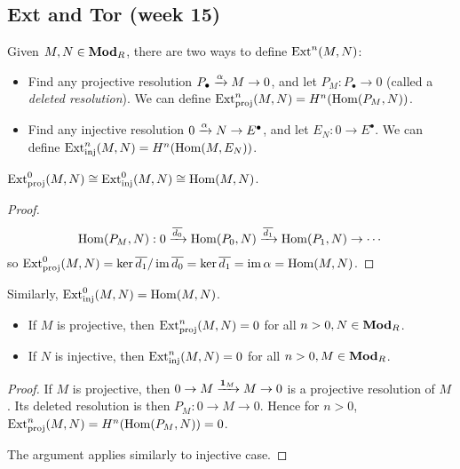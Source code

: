 \subsection{Ext and Tor (week 15)}

Given $M, N \in \mathbf{Mod}_R$, there are two ways to define $\operatorname{Ext}^n(M, N)$:

\begin{definition} \mbox{}
  \begin{itemize}
    \item Find any projective resolution $P_\bullet \xrightarrow{\alpha} M \to 0$,
      and let $P_M : P_\bullet \to 0$ (called a {\it deleted resolution}).
      We can define $\operatorname{Ext}_{\mathrm{proj}}^{n}(M, N) = H^n(\operatorname{Hom}(P_M, N))$.
    \item Find any injective resolution $0 \xrightarrow{\alpha} N \to E^\bullet$,
      and let $E_N : 0 \to E^\bullet$.
      We can define $\operatorname{Ext}_{\mathrm{inj}}^{n}(M, N) = H^n(\operatorname{Hom}(M, E_N))$.
  \end{itemize}
\end{definition}

\begin{prop}
  $\operatorname{Ext}_{\mathrm{proj}}^0(M, N) \cong \operatorname{Ext}_{\mathrm{inj}}^0(M, N) \cong \operatorname{Hom}(M, N)$.
  \begin{proof}
    $$\operatorname{Hom}(P_M, N) : 0 \xrightarrow{\overline{d_0}} \operatorname{Hom}(P_0, N) \xrightarrow{\overline{d_1}} \operatorname{Hom}(P_1, N) \to \cdots$$
    so $\operatorname{Ext}_{\mathrm{proj}}^0(M, N) = \ker \overline{d_1} / \operatorname{im} \overline{d_0} = \ker \overline{d_1} = \operatorname{im} \alpha = \operatorname{Hom}(M, N)$.
  \end{proof}
  Similarly, $\operatorname{Ext}_{\mathrm{inj}}^0(M, N) = \operatorname{Hom}(M, N)$.
\end{prop}

\begin{lemma} \mbox{}
  \begin{itemize}
    \item If $M$ is projective, then $\operatorname{Ext}_{\mathrm{proj}}^n(M, N) = 0$ for all $n > 0, N \in \mathbf{Mod}_R$.
    \item If $N$ is injective, then $\operatorname{Ext}_{\mathrm{inj}}^n(M, N) = 0$ for all $n > 0, M \in \mathbf{Mod}_R$.
  \end{itemize}
  
  \begin{proof}
    If $M$ is projective, then $0 \to M \xrightarrow{\mathbf{1}_M} M \to 0$ is a projective resolution
    of $M$.
    Its deleted resolution is then $P_M : 0 \to M \to 0$.
    Hence for $n > 0$, $\operatorname{Ext}_{\mathrm{proj}}^n(M, N) = H^n(\operatorname{Hom}(P_M, N)) = 0$.

    The argument applies similarly to injective case.
  \end{proof}
\end{lemma}

